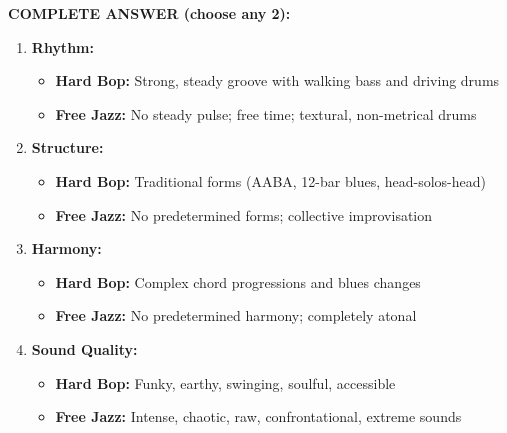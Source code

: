 \documentclass[11pt]{article}
\begin{document}
\begin{mdframed}[backgroundcolor=answercolor!10, linewidth=2pt]
\textbf{\textcolor{answercolor}{COMPLETE ANSWER (choose any 2):}}

\begin{enumerate}[leftmargin=*, nosep]
    \item \textbf{Rhythm:}
    \begin{itemize}[nosep]
        \item \textbf{Hard Bop:} Strong, steady groove with walking bass and driving drums
        \item \textbf{Free Jazz:} No steady pulse; free time; textural, non-metrical drums
    \end{itemize}
    
    \item \textbf{Structure:}
    \begin{itemize}[nosep]
        \item \textbf{Hard Bop:} Traditional forms (AABA, 12-bar blues, head-solos-head)
        \item \textbf{Free Jazz:} No predetermined forms; collective improvisation
    \end{itemize}
    
    \item \textbf{Harmony:}
    \begin{itemize}[nosep]
        \item \textbf{Hard Bop:} Complex chord progressions and blues changes
        \item \textbf{Free Jazz:} No predetermined harmony; completely atonal
    \end{itemize}
    
    \item \textbf{Sound Quality:}
    \begin{itemize}[nosep]
        \item \textbf{Hard Bop:} Funky, earthy, swinging, soulful, accessible
        \item \textbf{Free Jazz:} Intense, chaotic, raw, confrontational, extreme sounds
    \end{itemize}
\end{enumerate}

\vspace{5pt}
\end{mdframed}
\end{document}
